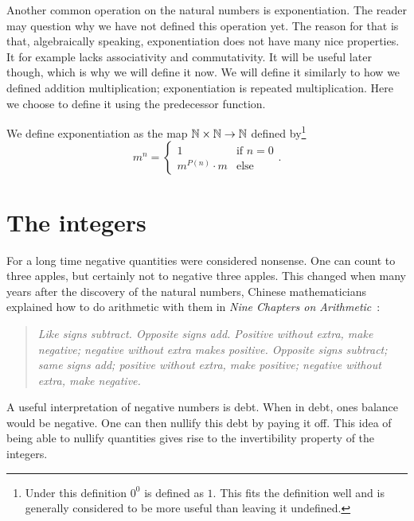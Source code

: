 \documentclass[../main.tex]{subfiles}
\begin{document}
Another common operation on the natural numbers is exponentiation. The reader may question why we have not defined this operation yet. The reason for that is that, algebraically speaking, exponentiation does not have many nice properties. It for example lacks associativity and commutativity. It will be useful later though, which is why we will define it now. We will define it similarly to how we defined addition multiplication; exponentiation is repeated multiplication. Here we choose to define it using the predecessor function.
\begin{definition}
    We define exponentiation as the map $\mathbb{N}\times\mathbb{N}\to\mathbb{N}$ defined by\footnote{Under this definition $0^0$ is defined as $1$. This fits the definition well and is generally considered to be more useful than leaving it undefined.}
    \begin{equation*}
        m^n=
        \begin{cases}
            1 & \text{if }n=0 \\
            m^{P(n)}\cdot m & \text{else}
        \end{cases}.
    \end{equation*}
\end{definition}

\section{The integers}\label{sec:the_natural_numbers_integers_and_rational_numbers:the_integers}
For a long time negative quantities were considered nonsense. One can count to three apples, but certainly not to negative three apples. This changed when many years after the discovery of the natural numbers, Chinese mathematicians explained how to do arithmetic with them in \textit{Nine Chapters on Arithmetic}~\cite{NineChapters20}:
\begin{quote}
\end{quote}
\begin{quote}
    \textit{Like signs subtract. Opposite signs add. Positive without extra, make negative; negative without extra makes positive. Opposite signs subtract; same signs add; positive without extra, make positive; negative without extra, make negative.}
\end{quote}
A useful interpretation of negative numbers is debt. When in debt, ones balance would be negative. One can then nullify this debt by paying it off. This idea of being able to nullify quantities gives rise to the invertibility property of the integers.
\end{document}
